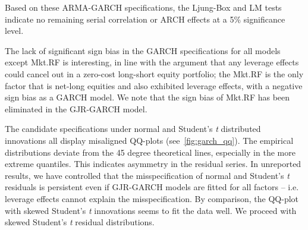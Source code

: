 

Based on these ARMA-GARCH specifications, the Ljung-Box and LM tests indicate no remaining serial correlation or ARCH effects at a 5\% significance level.

The lack of significant sign bias in the GARCH specifications for all models except Mkt.RF is interesting, in line with the argument that any leverage effects could cancel out in a zero-cost long-short equity portfolio; the Mkt.RF is the only factor that is net-long equities and also exhibited leverage effects, with a negative sign bias as a GARCH model. We note that the sign bias of Mkt.RF has been eliminated in the GJR-GARCH model.

The candidate specifications under normal and Student's \textit{t} distributed innovations all display misaligned QQ-plots (see~\autoref{fig:garch_qq}). The empirical distributions deviate from the 45 degree theoretical lines, especially in the more extreme quantiles. This indicates asymmetry in the residual series. In unreported results, we have controlled that the misspecification of normal and Student's \textit{t} residuals is persistent even if GJR-GARCH models are fitted for all factors -- i.e. leverage effects cannot explain the misspecification. By comparison, the QQ-plot with skewed Student's \textit{t} innovations seems to fit the data well. We proceed with skewed Student's \textit{t} residual distributions.

